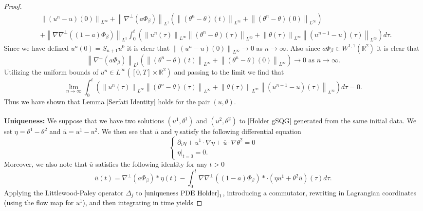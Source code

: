\documentclass[12pt,xcolor=svgnames]{amsart}
\newcommand{\R}{\mathbb{R}}
\newcommand{\norm}[2]{\left\lVert#1\right\rVert_{#2}}
\begin{document}
\begin{proof}
\begin{align*}
&\norm{(u^n-u)(0)}{L^{\infty}} + \norm{\nabla^{\perp}(a\Phi_{\beta})}{L^1}(\norm{(\theta^n-\theta)(t)}{L^{\infty}} + \norm{(\theta^n-\theta)(0)}{L^{\infty}}) \\
&+\norm{\nabla\nabla^{\perp}((1-a)\Phi_{\beta})}{L^1}\int_0^t \left( \norm{u^n(\tau)}{L^{\infty}}\norm{(\theta^n-\theta)(\tau)}{L^{\infty}} + \norm{\theta(\tau)}{L^{\infty}}\norm{(u^{n-1}-u)(\tau)}{L^{\infty}}\right)d\tau.
\end{align*}
Since we have defined $u^n(0)=S_{n+1}u^0$ it is clear that $\norm{(u^n-u)(0)}{L^{\infty}} \to 0$ as $n \to \infty$. Also since $a \Phi_{\beta} \in W^{1,1}(\R^2)$ it is clear that 
$$
\norm{\nabla^{\perp}(a\Phi_{\beta})}{L^1}(\norm{(\theta^n-\theta)(t)}{L^{\infty}} + \norm{(\theta^n-\theta)(0)}{L^{\infty}}) \to 0 \text{ as } n \to \infty.
$$
Utilizing the uniform bounds of $u^n \in L^{\infty}([0,T] \times \R^2)$ and passing to the limit we find that
$$
\lim_{n \to \infty} \int_0^t \left( \norm{u^n(\tau)}{L^{\infty}}\norm{(\theta^n-\theta)(\tau)}{L^{\infty}} + \norm{\theta(\tau)}{L^{\infty}}\norm{(u^{n-1}-u)(\tau)}{L^{\infty}}\right)d\tau = 0.
$$
Thus we have shown that Lemma \ref{Serfati Identity} holds for the pair $(u,\theta)$. 
\\
\\
\textbf{Uniqueness:} We suppose that we have two solutions $(u^1,\theta^1)$ and $(u^2,\theta^2)$ to \eqref{Holder gSQG} generated from the same initial data. We set $\eta = \theta^1-\theta^2$ and $\overline{u}=u^1-u^2$. We then see that $\overline{u}$ and $\eta$ satisfy the following differential equation
\begin{equation}
\label{uniqueness PDE Holder}
\begin{cases}
\partial_t \eta +u^1\cdot \nabla \eta +\overline{u}\cdot\nabla\theta^2=0 \\
\eta\vert_{t=0}=0.
\end{cases}
\end{equation}
Moreover, we also note that $\overline{u}$ satisfies the following identity for any $t>0$
\begin{equation}
\label{holder serfati uniqueness}
\overline{u}(t) = \nabla^{\perp}(a\Phi_{\beta})\ast\eta(t)-\int_0^t \nabla\nabla^{\perp}((1-a)\Phi_{\beta})\ast\cdot(\eta u^1 + \theta^2 \overline{u})(\tau)d\tau.
\end{equation}
Applying the Littlewood-Paley operator $\Delta_j$ to $\eqref{uniqueness PDE Holder}_1$, introducing a commutator, rewriting in Lagrangian coordinates (using the flow map for $u^1$), and then integrating in time yields

\end{proof}
\end{document}
